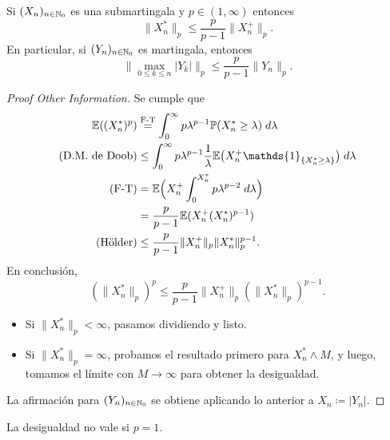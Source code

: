 \begin{theorem}
	Si $(X_{n})_{n \in \mathbb{N}_{0}}$ es una submartingala y $p \in (1, \infty)$ entonces
	\[ \| X_{n}^{*} \|_{p} \leq \frac{p}{p-1} \| X_{n}^{+} \|_{p}. \]
	En particular, si $(Y_{n})_{n \in \mathbb{N}_{0}}$ es martingala, entonces
	\[ \big\| \max_{0 \leq k \leq n} |Y_{k}| \big\|_{p} \leq \frac{p}{p-1} \| Y_{n} \|_{p}. \]
\end{theorem}
\begin{proof}[Proof Other Information]
	Se cumple que
	\begin{align*}
		\mbb{E}((X_{n}^{*})^{p}) &\stackrel{\text{F-T}}{=} \int_{0}^{\infty} p \lambda^{p-1} \mbb{P}(X_{n}^{*} \geq \lambda) \; d\lambda \\
		\text{(D.M. de Doob)} &\leq \int_{0}^{\infty} p \lambda^{p-1} \frac{1}{\lambda} \mbb{E}\big(X_{n}^{+} \mathds{1}_{\{X_{n}^{*} \geq \lambda\}}\big) \; d\lambda \\
		\text{(F-T)} &= \mbb{E}\Big( X_{n}^{+} \int_{0}^{X_{n}^{*}} p \lambda^{p-2} \; d\lambda \Big) \\
		&= \frac{p}{p-1} \mbb{E}(X_{n}^{+} (X_{n}^{*})^{p-1}) \\
		\text{(Hölder)} &\leq \frac{p}{p-1} \| X_{n}^{+} \|_{p} \| X_{n}^{*} \|_{p}^{p-1}
	.\end{align*}
	En conclusión,
	\[ (\| X_{n}^{*} \|_{p})^{p} \leq \frac{p}{p-1} \| X_{n}^{+} \|_{p} (\| X_{n}^{*} \|_{p})^{p-1}. \]
	\begin{itemize}
		\item Si $\| X_{n}^{*} \|_{p} < \infty$, pasamos dividiendo y listo.

		\item Si $\| X_{n}^{*} \|_{p} = \infty$, probamos el resultado primero para $X_{n}^{*} \wedge M$, y luego, tomamos el límite con $M \longrightarrow \infty$ para obtener la desigualdad.
	\end{itemize}
	La afirmación para $(Y_{n})_{n \in \mathbb{N}_{0}}$ se obtiene aplicando lo anterior a $X_{n} \coloneq |Y_{n}|$.
\end{proof}

\begin{remark}
	La desigualdad no vale si $p = 1$.
\end{remark}

